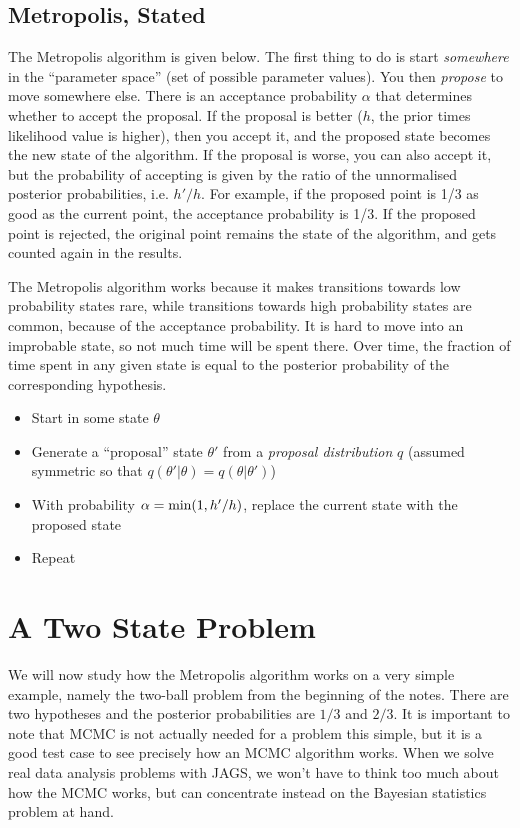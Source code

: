 \subsection{Metropolis, Stated}
The Metropolis algorithm is given below. The first thing to do is start
{\it somewhere} in the ``parameter space'' (set of possible parameter values).
You then
{\it propose} to move somewhere else. There is an acceptance probability $\alpha$
that determines whether to accept the proposal. If the proposal is better
($h$, the prior times likelihood value is higher), then you accept it, and the
proposed state becomes the new state of the algorithm.
If the
proposal is worse, you can also accept it, but the probability of accepting is
given by the ratio of the unnormalised posterior probabilities, i.e. $h'/h$.
For example, if the proposed point is 1/3 as good as the current point, the
acceptance probability is 1/3. If the proposed point is rejected, the original
point remains the state of the algorithm, and gets counted again in the results.

The Metropolis algorithm works because it makes transitions towards low
probability
states rare, while transitions towards high probability states are common, because
of the acceptance probability. It is hard to move into an improbable state, so
not much time will be spent there. Over time, the fraction of time spent in
any given state is equal to the posterior probability of the corresponding
hypothesis.

\begin{framed}
\begin{itemize}
\item Start in some state $\theta$
\item Generate a ``proposal'' state $\theta'$ from a {\it proposal distribution} $q$ (assumed symmetric so that $q(\theta'|\theta)=q(\theta|\theta')$)
\item With probability $\alpha = \textnormal{min}(1, h'/h)$, replace the current
state with the proposed state
\item Repeat
\end{itemize}
\end{framed}

\section{A Two State Problem}
We will now study how the Metropolis algorithm works on a very simple
example, namely the two-ball problem from the beginning of the notes. There
are two hypotheses and the posterior probabilities are $1/3$ and $2/3$.
It is important to note that MCMC is not actually needed for a problem this
simple, but it is a good test case to see precisely how an MCMC algorithm works.
When we solve real data analysis problems with JAGS,
we won't have to think too
much about how the MCMC works, but can concentrate instead on the Bayesian
statistics problem at hand.

